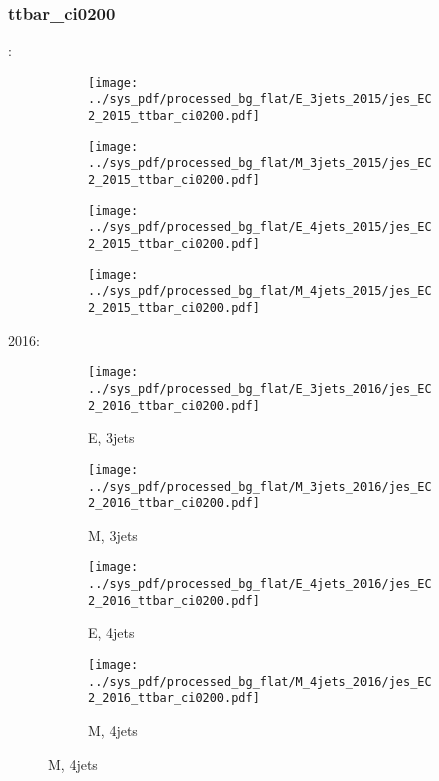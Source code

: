 \documentclass{beamer}
\begin{document}
\begin{frame}
\frametitle{ttbar_ci0200}
\fontsize{5}{1}:
\begin{figure}
\centering
\begin{subfigure}[b]{0.24\textwidth}
\texttt{[image: ../sys\_pdf/processed\_bg\_flat/E\_3jets\_2015/jes\_EC2\_2015\_ttbar\_ci0200.pdf]}
\end{subfigure}
\begin{subfigure}[b]{0.24\textwidth}
\texttt{[image: ../sys\_pdf/processed\_bg\_flat/M\_3jets\_2015/jes\_EC2\_2015\_ttbar\_ci0200.pdf]}
\end{subfigure}
\begin{subfigure}[b]{0.24\textwidth}
\texttt{[image: ../sys\_pdf/processed\_bg\_flat/E\_4jets\_2015/jes\_EC2\_2015\_ttbar\_ci0200.pdf]}
\end{subfigure}
\begin{subfigure}[b]{0.24\textwidth}
\texttt{[image: ../sys\_pdf/processed\_bg\_flat/M\_4jets\_2015/jes\_EC2\_2015\_ttbar\_ci0200.pdf]}
\end{subfigure}
\end{figure}
2016:
\begin{figure}
\centering
\begin{subfigure}[b]{0.24\textwidth}
\texttt{[image: ../sys\_pdf/processed\_bg\_flat/E\_3jets\_2016/jes\_EC2\_2016\_ttbar\_ci0200.pdf]}
\captionsetup{font=tiny}
\caption{E, 3jets}
\end{subfigure}
\begin{subfigure}[b]{0.24\textwidth}
\texttt{[image: ../sys\_pdf/processed\_bg\_flat/M\_3jets\_2016/jes\_EC2\_2016\_ttbar\_ci0200.pdf]}
\captionsetup{font=tiny}
\caption{M, 3jets}
\end{subfigure}
\begin{subfigure}[b]{0.24\textwidth}
\texttt{[image: ../sys\_pdf/processed\_bg\_flat/E\_4jets\_2016/jes\_EC2\_2016\_ttbar\_ci0200.pdf]}
\captionsetup{font=tiny}
\caption{E, 4jets}
\end{subfigure}
\begin{subfigure}[b]{0.24\textwidth}
\texttt{[image: ../sys\_pdf/processed\_bg\_flat/M\_4jets\_2016/jes\_EC2\_2016\_ttbar\_ci0200.pdf]}
\captionsetup{font=tiny}
\caption{M, 4jets}
\end{subfigure}
\end{figure}
\end{frame}
\end{document}
